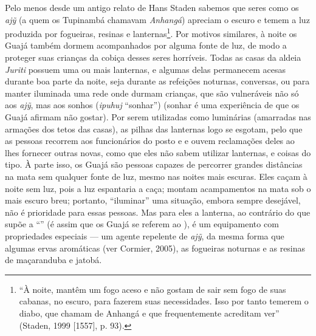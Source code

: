 Pelo menos desde um antigo relato de Hans Staden sabemos que seres como
os \emph{ajỹ} (a quem os Tupinambá chamavam \emph{Anhangá}) apreciam o
escuro e temem a luz produzida por fogueiras, resinas e
lanternas\footnote{``À noite, mantêm um fogo aceso e não gostam de sair
  sem fogo de suas cabanas, no escuro, para fazerem suas necessidades.
  Isso por tanto temerem o diabo, que chamam de Anhangá e que
  frequentemente acreditam ver'' (Staden, 1999 {[}1557{]}, p. 93).}. Por
motivos similares, à noite os Guajá também dormem acompanhados por
alguma fonte de luz, de modo a proteger suas crianças da cobiça desses
seres horríveis. Todas as casas da aldeia \emph{Juriti} possuem uma ou
mais lanternas, e algumas delas permanecem acesas durante boa parte da
noite, seja durante as refeições noturnas, conversas, ou para manter
iluminada uma rede onde durmam crianças, que são vulneráveis não só aos
\emph{ajỹ}, mas aos sonhos (\emph{ipuhuj} ``sonhar'') (sonhar é uma
experiência de que os Guajá afirmam não gostar). Por serem utilizadas
como luminárias (amarradas nas armações dos tetos das casas), as pilhas
das lanternas logo se esgotam, pelo que as pessoas recorrem aos
funcionários do posto e e ouvem reclamações deles ao lhes fornecer
outras novas, como que eles não sabem utilizar lanternas, e coisas do
tipo. À parte isso, os Guajá são pessoas capazes de percorrer grandes
distâncias na mata sem qualquer fonte de luz, mesmo nas noites mais
escuras. Eles caçam à noite sem luz, pois a luz espantaria a caça;
montam acampamentos na mata sob o mais escuro breu; portanto, ``iluminar''
uma situação, embora sempre desejável, não é prioridade para essas
pessoas. Mas para eles a lanterna, ao contrário do que supõe a ``''
(é assim que os Guajá se referem ao ), é um equipamento com
propriedades especiais --- um agente repelente de \emph{ajỹ}, da mesma
forma que algumas ervas aromáticas (ver Cormier, 2005), as fogueiras
noturnas e as resinas de maçaranduba e jatobá.

